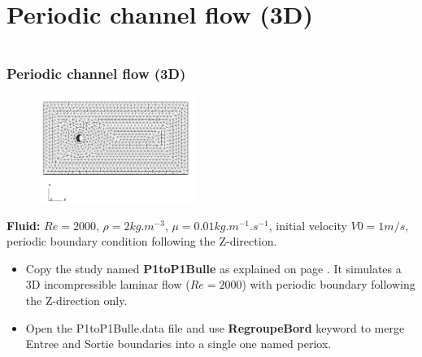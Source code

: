 \documentclass[10pt, hyperref={unicode=true,pdfusetitle, bookmarks=true,bookmarksnumbered=false,bookmarksopen=false, breaklinks=false,pdfborder={0 0 1},backref=true,colorlinks=true,linkcolor=darkblue,pageanchor}]{beamer}
\begin{document}
\section{{\bf{Periodic channel flow (3D)}}}
\begin{frame}
\begin{columns}[c] 
\tableofcontents[sections={1-9},currentsection, currentsubsection]
\tableofcontents[sections={10-16},currentsection, currentsubsection]
\end{columns}
\end{frame}
\begin{frame}
\frametitle{Periodic channel flow (3D)}
\begin{block}{}

\begin{figure}
\includegraphics[width=0.45\textwidth]{PICTURES/periodic3D.png}
\end{figure}

\textbf{Fluid:} $Re=2000$, $\rho=2 kg.m^{-3}$, $\mu=0.01 kg.m^{-1}.s^{-1}$, initial velocity $V0=1m/s$, periodic boundary condition following the Z-direction.

\begin{itemize}
\item Copy the study named \textbf{P1toP1Bulle} as explained on page \pageref{method_copy}. It simulates a 3D incompressible laminar flow ($Re=2000$) with periodic boundary following the Z-direction only.

\item Open the P1toP1Bulle.data file and use \textbf{RegroupeBord} keyword to merge Entree and Sortie boundaries into a single one named periox. 
\end{itemize}

\end{block}
\end{frame}
\end{document}
